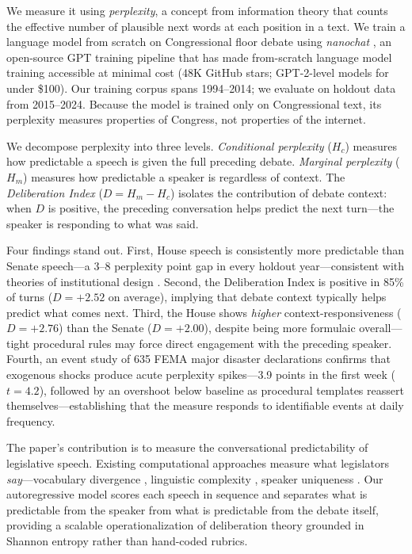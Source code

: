 \documentclass[12pt]{article}
\newcommand{\Hc}{H_c}
\newcommand{\Hm}{H_m}
\newcommand{\DI}{\mathit{D}}
\begin{document}
We measure it using \textit{perplexity}, a concept from information theory \citep{shannon1948} that counts the effective number of plausible next words at each position in a text. We train a language model from scratch on Congressional floor debate using \textit{nanochat} \citep{karpathy2025}, an open-source GPT training pipeline that has made from-scratch language model training accessible at minimal cost (48K GitHub stars; GPT-2-level models for under \$100). Our training corpus spans 1994--2014; we evaluate on holdout data from 2015--2024. Because the model is trained only on Congressional text, its perplexity measures properties of Congress, not properties of the internet.

We decompose perplexity into three levels. \textit{Conditional perplexity} ($\Hc$) measures how predictable a speech is given the full preceding debate. \textit{Marginal perplexity} ($\Hm$) measures how predictable a speaker is regardless of context. The \textit{Deliberation Index} ($\DI = \Hm - \Hc$) isolates the contribution of debate context: when $\DI$ is positive, the preceding conversation helps predict the next turn---the speaker is responding to what was said.

Four findings stand out. First, House speech is consistently more predictable than Senate speech---a 3--8 perplexity point gap in every holdout year---consistent with theories of institutional design \citep{perssonTabellini2000}. Second, the Deliberation Index is positive in 85\% of turns ($\DI = +2.52$ on average), implying that debate context typically helps predict what comes next. Third, the House shows \textit{higher} context-responsiveness ($\DI = +2.76$) than the Senate ($\DI = +2.00$), despite being more formulaic overall---tight procedural rules may force direct engagement with the preceding speaker. Fourth, an event study of 635 FEMA major disaster declarations confirms that exogenous shocks produce acute perplexity spikes---3.9 points in the first week ($t = 4.2$), followed by an overshoot below baseline as procedural templates reassert themselves---establishing that the measure responds to identifiable events at daily frequency.

The paper's contribution is to measure the conversational predictability of legislative speech. Existing computational approaches measure what legislators \textit{say}---vocabulary divergence \citep{gentzkow2019}, linguistic complexity \citep{spirling2016}, speaker uniqueness \citep{zhou2024}. Our autoregressive model scores each speech in sequence and separates what is predictable from the speaker from what is predictable from the debate itself, providing a scalable operationalization of deliberation theory \citep{habermas1996, steiner2004} grounded in Shannon entropy rather than hand-coded rubrics.
\end{document}
